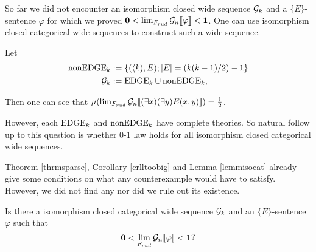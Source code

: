 So far we did not encounter an isomorphism closed wide sequence $\mathcal{G}_k$ and a $\{E\}$-sentence $\varphi$ for which we proved $\textbf{0}<\lim_{F_{rud}}\mathcal{G}_n[\![\varphi]\!]<\textbf{1}$. One can use isomorphism closed categorical wide sequences to construct such a wide sequence.
\begin{exam}
Let
\begin{align}
\text{nonEDGE}_k&:=\{(\langle k),E);\left|{E}\right|=(k(k-1)/2)-1\}\\
\mathcal{G}_k&:=\text{EDGE}_k\cup\text{nonEDGE}_k,
\end{align}

Then one can see that $\mu(\lim_{F_{rud}}\mathcal{G}_n[\![(\exists x)(\exists y)E(x,y)]\!])=\frac{1}{2}$.
\end{exam}

However, each $\text{EDGE}_k$ and $\text{nonEDGE}_k$ have complete theories. So natural follow up to this question is whether 0-1 law holds for all isomorphism closed categorical wide sequences. 

Theorem \ref{thrmsparse}, Corollary \ref{crlltoobig} and Lemma \ref{lemmisocat} already give some conditions on what any counterexample would have to satisfy. However, we did not find any nor did we rule out its existence. 

\begin{ques}
Is there a isomorphism closed categorical wide sequence $\mathcal{G}_k$ and an $\{E\}$-sentence $\varphi$ such that
\[\textbf{0}<\lim_{F_{rud}}\mathcal{G}_n[\![\varphi]\!]<\textbf{1}?\]
\end{ques}
